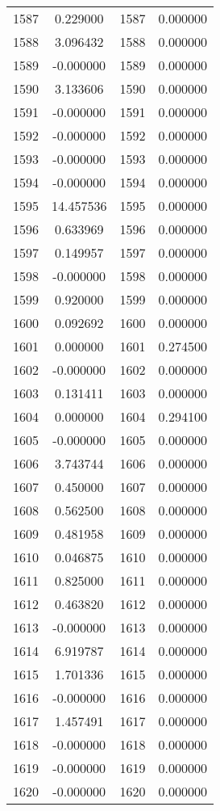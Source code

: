 \documentclass[12pt]{article}
\begin{document}
\begin{longtable}{@{}cccc@{}}
1587 & 0.229000 & 1587 & 0.000000 \\
1588 & 3.096432 & 1588 & 0.000000 \\
1589 & -0.000000 & 1589 & 0.000000 \\
1590 & 3.133606 & 1590 & 0.000000 \\
1591 & -0.000000 & 1591 & 0.000000 \\
1592 & -0.000000 & 1592 & 0.000000 \\
1593 & -0.000000 & 1593 & 0.000000 \\
1594 & -0.000000 & 1594 & 0.000000 \\
1595 & 14.457536 & 1595 & 0.000000 \\
1596 & 0.633969 & 1596 & 0.000000 \\
1597 & 0.149957 & 1597 & 0.000000 \\
1598 & -0.000000 & 1598 & 0.000000 \\
1599 & 0.920000 & 1599 & 0.000000 \\
1600 & 0.092692 & 1600 & 0.000000 \\
1601 & 0.000000 & 1601 & 0.274500 \\
1602 & -0.000000 & 1602 & 0.000000 \\
1603 & 0.131411 & 1603 & 0.000000 \\
1604 & 0.000000 & 1604 & 0.294100 \\
1605 & -0.000000 & 1605 & 0.000000 \\
1606 & 3.743744 & 1606 & 0.000000 \\
1607 & 0.450000 & 1607 & 0.000000 \\
1608 & 0.562500 & 1608 & 0.000000 \\
1609 & 0.481958 & 1609 & 0.000000 \\
1610 & 0.046875 & 1610 & 0.000000 \\
1611 & 0.825000 & 1611 & 0.000000 \\
1612 & 0.463820 & 1612 & 0.000000 \\
1613 & -0.000000 & 1613 & 0.000000 \\
1614 & 6.919787 & 1614 & 0.000000 \\
1615 & 1.701336 & 1615 & 0.000000 \\
1616 & -0.000000 & 1616 & 0.000000 \\
1617 & 1.457491 & 1617 & 0.000000 \\
1618 & -0.000000 & 1618 & 0.000000 \\
1619 & -0.000000 & 1619 & 0.000000 \\
1620 & -0.000000 & 1620 & 0.000000 \\

\end{longtable}
\end{document}
